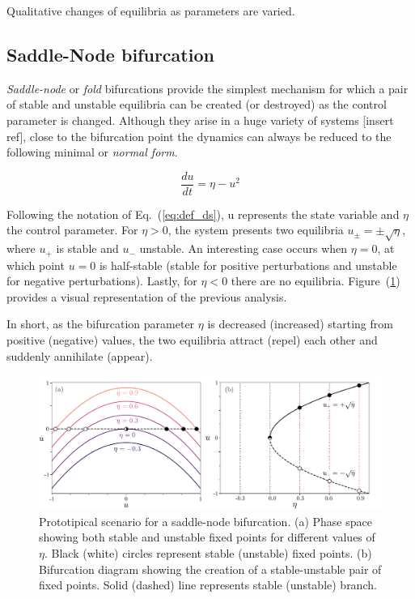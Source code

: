 Qualitative changes of equilibria as parameters are varied.


\subsection{Saddle-Node bifurcation}

{\em Saddle-node} or {\em fold} bifurcations provide the simplest mechanism 
for which a pair of stable and unstable equilibria can be created (or destroyed) 
as the control parameter is changed. Although they arise in a huge variety of systems 
[insert ref], close to the bifurcation point the dynamics can always be reduced to
the following minimal or {\em normal form}.

\begin{equation}
    \dfrac{du}{dt} = \eta - u^2
    \label{eq:pre_bif_sn}
\end{equation}

Following the notation of Eq.~(\ref{eq:def_ds}), u represents the state variable
and $\eta$ the control parameter. For $\eta > 0$, the system presents two equilibria $u_{\pm} = \pm\sqrt{\eta}$, where $u_+$ is
stable and $u_-$ unstable. An interesting case occurs when $\eta = 0$, at which point $u = 0$ is
half-stable (stable for positive perturbations and unstable for negative perturbations). Lastly,
for $\eta < 0$ there are no equilibria. Figure~(\ref{fig:pre_bifs_sn}) provides a visual representation
of the previous analysis.

In short, as the bifurcation parameter $\eta$ is decreased (increased)
starting from positive (negative) values, the two equilibria attract (repel) each other and suddenly annihilate (appear).

\begin{figure}[h]
    \centering
    \includegraphics[width=\textwidth]{imagenes/framework/bif_sn_f.pdf}
    \caption{Prototipical scenario for a saddle-node bifurcation. (a) Phase space
    showing both stable and unstable fixed points for different values of $\eta$. 
    Black (white) circles represent
    stable (unstable) fixed points. (b) Bifurcation diagram showing
    the creation of a stable-unstable pair of fixed points. Solid (dashed) line represents
    stable (unstable) branch.}
    \label{fig:pre_bifs_sn}
\end{figure}

